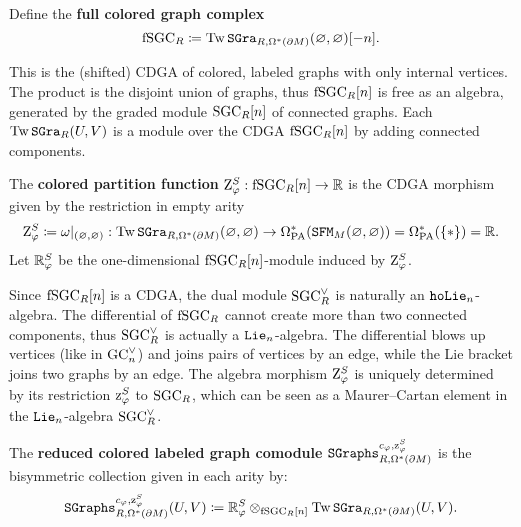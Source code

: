 \begin{definition}
  Define the \textbf{full colored graph complex}
  \[ \mathrm{fSGC}_{R} \coloneqq \operatorname{Tw} \mathtt{SGra}_{R, \Omega^{*}(\partial M)}(\varnothing, \varnothing)[-n]. \]
\end{definition}

This is the (shifted) CDGA of colored, labeled graphs with only internal vertices.
The product is the disjoint union of graphs, thus $\mathrm{fSGC}_{R}[n]$ is free as an algebra, generated by the graded module $\mathrm{SGC}_{R}[n]$ of connected graphs.
Each $\operatorname{Tw} \mathtt{SGra}_{R}(U,V)$ is a module over the CDGA $\mathrm{fSGC}_{R}[n]$ by adding connected components.

\begin{definition}
  The \textbf{colored partition function} $\mathrm{Z}_{\varphi}^{S} : \mathrm{fSGC}_{R}[n] \to \mathbb{R}$ is the CDGA morphism given by the restriction in empty arity
  \[ \mathrm{Z}_{\varphi}^{S} \coloneqq \omega|_{(\varnothing,\varnothing)} : \operatorname{Tw} \mathtt{SGra}_{R, \Omega^{*}(\partial M)}(\varnothing, \varnothing) \to \Omega_{\mathrm{PA}}^{*}(\mathtt{SFM}_{M}(\varnothing, \varnothing)) = \Omega_{\mathrm{PA}}^{*}(\{*\}) = \mathbb{R}. \]
  Let $\mathbb{R}^{S}_{\varphi}$ be the one-dimensional $\mathrm{fSGC}_{R}[n]$-module induced by $\mathrm{Z}_{\varphi}^{S}$.
\end{definition}

\begin{remark}
  \label{cnfbnd.rmk.maurer-cartan}
  Since $\mathrm{fSGC}_{R}[n]$ is a CDGA, the dual module $\mathrm{SGC}_{R}^{\vee}$ is naturally an $\mathtt{hoLie}_{n}$-algebra.
  The differential of $\mathrm{fSGC}_{R}$ cannot create more than two connected components, thus $\mathrm{SGC}_{R}^{\vee}$ is actually a $\mathtt{Lie}_{n}$-algebra.
  The differential blows up vertices (like in $\mathrm{GC}_{n}^{\vee}$) and joins pairs of vertices by an edge, while the Lie bracket joins two graphs by an edge.
  The algebra morphism $\mathrm{Z}_{\varphi}^{S}$ is uniquely determined by its restriction $\mathrm{z}^{S}_{\varphi}$ to $\mathrm{SGC}_{R}$, which can be seen as a Maurer--Cartan element in the $\mathtt{Lie}_{n}$-algebra $\mathrm{SGC}_{R}^{\vee}$.
\end{remark}

\begin{definition}
  The \textbf{reduced colored labeled graph comodule} $\mathtt{SGraphs}_{R, \Omega^{*}(\partial M)}^{c_{\varphi}, \mathrm{z}^{S}_{\varphi}}$ is the bisymmetric collection given in each arity by:
  \[ \mathtt{SGraphs}_{R, \Omega^{*}(\partial M)}^{c_{\varphi},\mathrm{z}^{S}_{\varphi}}(U, V) \coloneqq \mathbb{R}^{S}_{\varphi} \otimes_{\mathrm{fSGC}_{R}[n]} \operatorname{Tw} \mathtt{SGra}_{R, \Omega^{*}(\partial M)}(U,V). \]
\end{definition}

